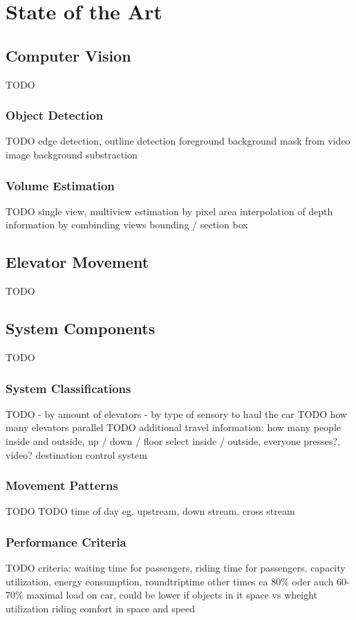 \chapter{State of the Art}
\label{chap:sota}

\section{Computer Vision}

TODO

\subsection{Object Detection}

TODO
edge detection, outline detection
foreground background mask from video image
background substraction

\subsection{Volume Estimation}

TODO
single view, multiview
estimation by pixel area
interpolation of depth information by combinding views
bounding / section box

\section{Elevator Movement}
TODO

\section{System Components}
TODO

\subsection{System Classifications}
TODO
- by amount of elevators
- by type of sensory to haul the car
TODO how many elevators parallel
TODO additional travel information: how many people inside and outside, up / down / floor select inside / outside, everyone presses?, video? 
destination control system

\subsection{Movement Patterns}
TODO
TODO time of day eg. upstream, down stream, cross stream

\subsection{Performance Criteria}
TODO
criteria: waiting time for passengers, riding time for passengers, capacity utilization, energy consumption, roundtriptime other times
ca 80\% oder auch 60-70\% maximal load on car, could be lower if objects in it
space vs wheight utilization
riding comfort in space and speed

